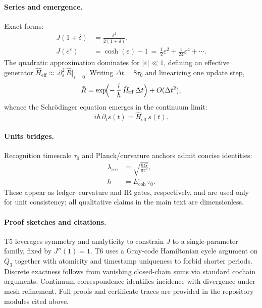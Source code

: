 \documentclass[aps,prx,twocolumn,superscriptaddress,nofootinbib]{revtex4-2}
\newcommand{\Rhat}{\hat{R}}
\newcommand{\Hhat}{\hat{H}}
\newcommand{\Jcost}{J}
\newcommand{\TauZero}{\tau_{0}}
\begin{document}
\paragraph*{Series and emergence.} Exact forms:
\begin{align}
  \Jcost(1+\delta) &= \frac{\delta^2}{2(1+\delta)},\\
  \Jcost(e^{\varepsilon}) &= \cosh(\varepsilon)-1 
   \,=\, \tfrac12\varepsilon^2 + \tfrac1{24}\varepsilon^4 + \cdots.
\end{align}
The quadratic approximation dominates for \(|\varepsilon|\ll 1\), defining an effective generator \(\Hhat_{\!\mathrm{eff}}\approx \bigl.\partial_\varepsilon^2\,\Rhat\bigr|_{\varepsilon=0}\). Writing \(\Delta t=8\TauZero\) and linearizing one update step,
\begin{equation}
  \Rhat = \exp\!\Bigl(-\,\frac{i}{\hbar}\,\Hhat_{\!\mathrm{eff}}\,\Delta t\Bigr) + O(\Delta t^2),
\end{equation}
whence the Schrödinger equation emerges in the continuum limit:
\begin{equation}
  i\hbar\,\partial_t s(t) = \Hhat_{\!\mathrm{eff}}\,s(t).
\end{equation}

\paragraph*{Units bridges.} Recognition timescale \(\TauZero\) and Planck/curvature anchors admit concise identities:
\begin{align}
  \lambda_{\mathrm{rec}} &= \sqrt{\frac{\hbar G}{\pi c^3}},\\
  \hbar &= E_{\!\mathrm{coh}}\,\TauZero.
\end{align}
These appear as ledger--curvature and IR gates, respectively, and are used only for unit consistency; all qualitative claims in the main text are dimensionless.

\paragraph*{Proof sketches and citations.} T5 leverages symmetry and analyticity to constrain \(\Jcost\) to a single-parameter family, fixed by \(\Jcost''(1)=1\). T6 uses a Gray-code Hamiltonian cycle argument on \(Q_3\) together with atomicity and timestamp uniqueness to forbid shorter periods. Discrete exactness follows from vanishing closed-chain sums via standard cochain arguments. Continuum correspondence identifies incidence with divergence under mesh refinement. Full proofs and certificate traces are provided in the repository modules cited above.
\end{document}

